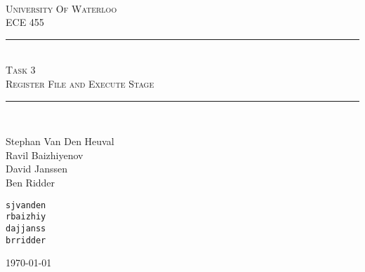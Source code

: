 \begin{titlepage}
\begin{center}
\vfill
\hfill
\\[2cm]
\textsc{\LARGE University Of Waterloo}
\\[1cm]
\textsc{\LARGE ECE 455}
\\[2cm]

\hrule
\hfill
\\[0.5cm]
\textsc{\huge Task 3}
\\[0.5cm]
\textsc{\huge Register File and Execute Stage}
\\[0.5cm]
\hrule
\hfill
\\[1cm]

\begin{minipage}{0.4\textwidth}
\begin{flushleft} \large
Stephan Van Den Heuval \\
Ravil Baizhiyenov \\
David Janssen \\
Ben Ridder
\end{flushleft}
\end{minipage}
\begin{minipage}{0.4\textwidth}
\begin{flushright} \large
\texttt{sjvanden} \\
\texttt{rbaizhiy} \\
\texttt{dajjanss} \\
\texttt{brridder} 
\end{flushright}
\end{minipage}


\vfill

{\large \today}
\end{center}
\end{titlepage}
